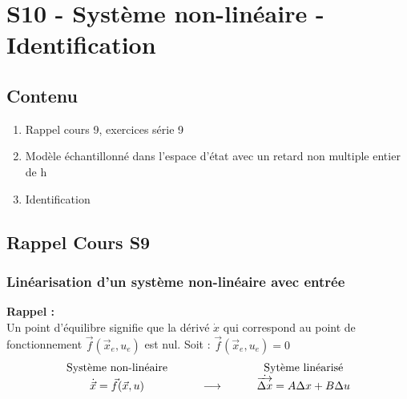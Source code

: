 \documentclass[document.tex]{subfiles}
\begin{document}
\section{S10 - Système non-linéaire - Identification}

\subsection{Contenu}
\begin{enumerate}
\item Rappel cours 9, exercices série 9
\item Modèle échantillonné dans l'espace d'état avec un retard non multiple entier de h 
\item Identification
\end{enumerate}

\subsection{Rappel Cours S9}

\subsubsection{Linéarisation d'un système non-linéaire avec entrée}

\textbf{Rappel : }\\
Un point d'équilibre signifie que la dérivé $\dot{x}$ qui correspond au point de fonctionnement $\vec{f}(\vec{x}_e,u_e)$ est nul. Soit : $\boxed{\vec{f}(\vec{x}_e,u_e) = 0}$\\

$$
\begin{array}{c c c}
\text{Système non-linéaire} & \quad \quad \quad \quad \quad \quad  & \text{Sytème linéarisé}\\
\dot{\vec{x}}=\vec{f}(\vec{x},u) & \longrightarrow & \dot{\overrightarrow{\Delta x}} = A \Delta x + B \Delta u
\end{array}
$$
\end{document}
